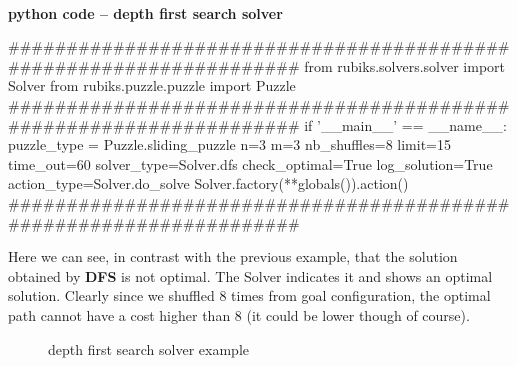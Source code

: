 \label{DFSSS}



\afblue
\paragraph{}{\textbf{python code -- depth first search solver}}
\begin{python}
####################################################################
from rubiks.solvers.solver import Solver
from rubiks.puzzle.puzzle import Puzzle
####################################################################
if '__main__' == __name__:
    puzzle_type = Puzzle.sliding_puzzle
    n=3
    m=3
    nb_shuffles=8
    limit=15
    time_out=60
    solver_type=Solver.dfs
    check_optimal=True
    log_solution=True
    action_type=Solver.do_solve
    Solver.factory(**globals()).action()
####################################################################

\end{python}
\black
Here we can see, in contrast with the previous example, that the solution obtained by \textbf{DFS} is not optimal. The Solver indicates it and shows an optimal solution. Clearly since we shuffled 8 times from goal configuration, the optimal path cannot have a cost higher than 8 (it could be lower though of course).



\begin{figure}[H]
  \noindent
  \caption[Examples]{depth first search solver example}
  \label{fig:exampledfssolver}
\end{figure}


